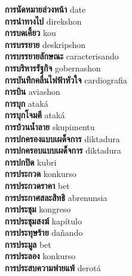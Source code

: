 \textbf{ การนัดหมายล่วงหน้า  } date \\
\textbf{ การนำทางไป  } direkshon \\
\textbf{ การบดเคี้ยว  } kou \\
\textbf{ การบรรยาย  } deskripshon \\
\textbf{ การบรรยายลักษณะ  } caracterisando \\
\textbf{ การบริหารรัฐกิจ  } gobernashon \\
\textbf{ การบันทึกคลื่นไฟฟ้าหัวใจ  } cardiografia \\
\textbf{ การบิน  } aviashon \\
\textbf{ การบุก  } ataká \\
\textbf{ การบุกโจมตี  } ataká \\
\textbf{ การบ้วนน้ำลาย  } skupimentu \\
\textbf{ การปกครองแบบเผด็จการ  } diktadura \\
\textbf{ การปกครอบแบบเผด็จการ  } diktadura \\
\textbf{ การปกปิด  } kubri \\
\textbf{ การประกวด  } konkurso \\
\textbf{ การประกวดราคา  } bet \\
\textbf{ การประกาศสละสิทธิ  } abrenunsia \\
\textbf{ การประชุม  } kongreso \\
\textbf{ การประชุมสงฆ์  } kapítulo \\
\textbf{ การประทุษร้าย  } dañando \\
\textbf{ การประมูล  } bet \\
\textbf{ การประลอง  } konkurso \\
\textbf{ การประสบความพ่ายแพ้  } derotá \\
